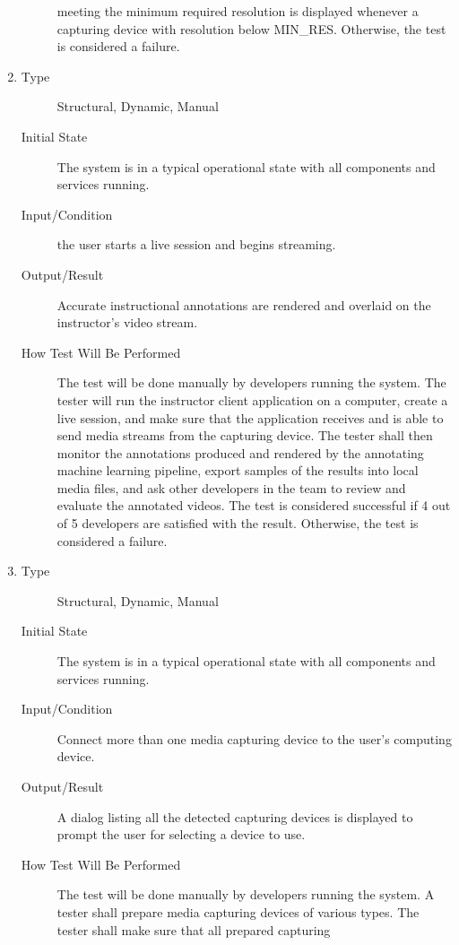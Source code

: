 \documentclass[12pt, titlepage]{article}
\begin{document}
\begin{enumerate}[NFR-T1]
\begin{description}
    meeting the minimum required resolution is displayed whenever a capturing
    device with resolution below MIN\_RES. Otherwise, the test is
    considered a failure.
  \end{description}
\item \label{NFRT12}
  \begin{description}
  \item[Type] Structural, Dynamic, Manual
  \item[Initial State] The system is in a typical operational state with all
    components and services running.
  \item[Input/Condition] the user starts a live session and begins streaming.
  \item[Output/Result] Accurate instructional annotations are rendered and
    overlaid on the instructor’s video stream.
  \item[How Test Will Be Performed] The test will be done manually by developers
    running the system. The tester will run the instructor client application on
    a computer, create a live session, and make sure that the application
    receives and is able to send media streams from the capturing device. The
    tester shall then monitor the annotations produced and rendered by the
    annotating machine learning pipeline, export samples of the results into
    local media files, and ask other developers in the team to review and
    evaluate the annotated videos. The test is considered successful if 4 out of
    5 developers are satisfied with the result. Otherwise, the test is
    considered a failure.
  \end{description}
\item \label{NFRT13}
  \begin{description}
  \item[Type] Structural, Dynamic, Manual
  \item[Initial State] The system is in a typical operational state with all
    components and services running.
  \item[Input/Condition] Connect more than one media capturing device to the
    user’s computing device.
  \item[Output/Result] A dialog listing all the detected capturing devices is
    displayed to prompt the user for selecting a device to use.
  \item[How Test Will Be Performed] The test will be done manually by developers
    running the system. A tester shall prepare media capturing devices of
    various types. The tester shall make sure that all prepared capturing

\end{description}
\end{enumerate}
\end{document}
